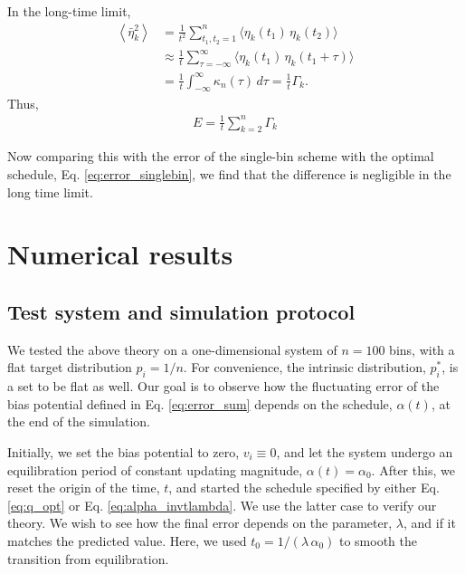 \documentclass[reprint, floatfix]{revtex4-1}
\begin{document}
In the long-time limit,
\begin{align*}
\left\langle
  \bar \eta_k^2
\right\rangle
&=
\frac{1}{t^2}
\sum_{ t_1, t_2 = 1 }^n
\langle \eta_k(t_1) \, \eta_k(t_2) \rangle
\\
&\approx
\frac{1}{t}
\sum_{ \tau = -\infty }^{ \infty }
\langle \eta_k(t_1) \, \eta_k(t_1 + \tau) \rangle
\\
&=
\frac{1 }{t}
\int_{-\infty}^\infty
\kappa_n(\tau) \, d\tau
=
\frac{1}{t}
\Gamma_k.
\end{align*}
%
Thus,
\begin{align}
E
=
\frac{ 1 } { t }
\sum_{ k = 2 }^n \Gamma_k
\end{align}

Now comparing this with the error of the single-bin scheme
with the optimal schedule,
Eq. \eqref{eq:error_singlebin},
we find that the difference is negligible
in the long time limit.



\section{\label{sec:results}
Numerical results}



\subsection{Test system and simulation protocol}


We tested the above theory on a one-dimensional system
of $n = 100$ bins,
with a flat target distribution
$p_i = 1/n$.
%
For convenience,
the intrinsic distribution, $p^*_i$,
is a set to be flat as well.
%
Our goal is to observe how the fluctuating error
of the bias potential defined in Eq. \eqref{eq:error_sum}
depends on the schedule, $\alpha(t)$,
at the end of the simulation.



Initially,
we set the bias potential to zero,
$v_i \equiv 0$,
%
and let the system undergo an equilibration period
of constant updating magnitude,
$\alpha(t) = \alpha_0$.
%
After this,
we reset the origin of the time, $t$,
and started the schedule specified by
either
Eq. \eqref{eq:q_opt}
or
Eq. \eqref{eq:alpha_invtlambda}.
%
We use the latter case to verify our theory.
%
We wish to see how the final error
depends on the parameter, $\lambda$,
and if it matches the predicted value.
%
Here, we used $t_0 = 1/(\lambda \, \alpha_0)$
to smooth the transition from equilibration.
\end{document}
